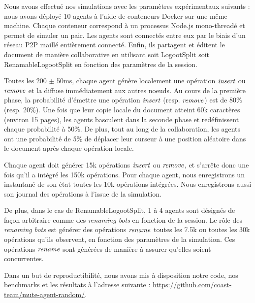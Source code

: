 Nous avons effectué nos simulations avec les paramètres expérimentaux suivants : nous avons déployé 10 agents à l'aide de conteneurs Docker sur une même machine.
Chaque conteneur correspond à un processus Node.js mono-threadé et permet de simuler un pair.
Les agents sont connectés entre eux par le biais d'un réseau P2P maillé entièrement connecté.
Enfin, ils partagent et éditent le document de manière collaborative en utilisant soit LogootSplit soit RenamableLogootSplit en fonction des paramètres de la session.

Toutes les 200 $\pm$ 50ms, chaque agent génère localement une opération $\mathit{insert}$ ou $\mathit{remove}$ et la diffuse immédiatement aux autres noeuds.
Au cours de la première phase, la probabilité d'émettre une opération $\mathit{insert}$ (resp. $\mathit{remove}$) est de 80\% (resp. 20\%).
Une fois que leur copie locale du document atteint 60k caractères (environ 15 pages), les agents basculent dans la seconde phase et redéfinissent chaque probabilité à 50\%.
De plus, tout au long de la collaboration, les agents ont une probabilité de 5\% de déplacer leur curseur à une position aléatoire dans le document après chaque opération locale.

Chaque agent doit générer 15k opérations $\mathit{insert}$ ou $\mathit{remove}$, et s'arrête donc une fois qu'il a intégré les 150k opérations.
Pour chaque agent, nous enregistrons un instantané de son état toutes les 10k opérations intégrées.
Nous enregistrons aussi son journal des opérations à l'issue de la simulation.

De plus, dans le cas de RenamableLogootSplit, 1 à 4 agents sont désignés de façon arbitraire comme des \emph{renaming bots} en fonction de la session.
Le rôle des \emph{renaming bots} est générer des opérations $\mathit{rename}$ toutes les 7.5k ou toutes les 30k opérations qu'ils observent, en fonction des paramètres de la simulation.
Ces opérations $\mathit{rename}$ sont générées de manière à assurer qu'elles soient concurrentes.

Dans un but de reproductibilité, nous avons mis à disposition notre code, nos benchmarks et les résultats à l'adresse suivante : \url{https://github.com/coast-team/mute-agent-random/}.
